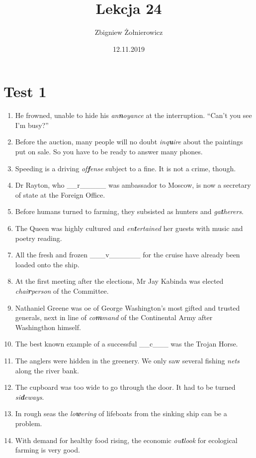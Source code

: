 \documentclass[a4paper]{article}
\begin{document}
\title{{\huge Lekcja 24} \\
{\large }}
\author{Zbigniew Żołnierowicz}
\date{12.11.2019}
\maketitle
\section{Test 1}
\begin{enumerate}
    \item He frowned, unable to hide his \emph{an{\bf n}oyance} at the interruption. ``Can't you see I'm busy?''
    \item Before the auction, many people will no doubt \emph{inq{\bf u}ire} about the paintings put on sale. So you have to be ready to answer many phones.
    \item Speeding is a driving \emph{of{\bf f}ense} subject to a fine. It is not a crime, though.
    \item Dr Rayton, who \_\_r\_\_\_\_\_ was ambassador to Moscow, is now a secretary of state at the Foreign Office.
    \item Before humans turned to farming, they subsisted as hunters and \emph{ga{\bf t}herers}.
    \item The Queen was highly cultured and \emph{en{\bf t}ertained} her guests with music and poetry reading.
    \item All the fresh and frozen \_\_\_v\_\_\_\_\_\_ for the cruise have already been loaded onto the ship.
    \item At the first meeting after the elections, Mr Jay Kabinda was elected \emph{chai{\bf r}person} of the Committee.
    \item Nathaniel Greene was oe of George Washington's most gifted and trusted generals, next in line of \emph{co{\bf m}mand} of the Continental Army after Washingthon himself.
    \item The best known example of a successful \_\_c\_\_\_ was the Trojan Horse.
    \item The anglers were hidden in the greenery. We only saw several fishing \emph{nets} along the river bank.
    \item The cupboard was too wide to go through the door. It had to be turned \emph{si{\bf d}eways}.
    \item In rough seas the \emph{lo{\bf w}ering} of lifeboats from the sinking ship can be a problem.
    \item With demand for healthy food rising, the economic \emph{ou{\bf t}look} for ecological farming is very good.

\end{enumerate}
\end{document}
